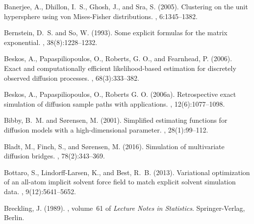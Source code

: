 \documentclass[oneside,11pt]{article}
\begin{document}
\begin{thebibliography}{}
	
	Banerjee, A., Dhillon, I.~S., Ghosh, J., and Sra, S. (2005).
	\newblock Clustering on the unit hypersphere using von {M}ises-{F}isher
	distributions.
	, 6:1345--1382.
	
	Bernstein, D.~S. and So, W. (1993).
	\newblock Some explicit formulas for the matrix exponential.
	, 38(8):1228--1232.
	
	Beskos, A., Papaspiliopoulos, O., Roberts, G. O., and Fearnhead, P. (2006).
	\newblock Exact and
computationally efficient likelihood-based estimation for discretely observed
	diffusion processes. 
	, 68(3):333--382.
	
	Beskos, A., Papaspiliopoulos, O., Roberts G. O. (2006a).
	\newblock Retrospective exact simulation of diffusion sample paths with applications. 
	, 12(6):1077--1098.

	Bibby, B.~M. and S{\o}rensen, M. (2001).
	\newblock Simplified estimating functions for diffusion models with a
	high-dimensional parameter.
	, 28(1):99--112.
	
	Bladt, M., Finch, S., and {S\o rensen}, M. (2016).
	\newblock Simulation of multivariate diffusion
bridges. 
	, 78(2):343--369.
	
	Bottaro, S., Lindorff-Larsen, K., and Best, R.~B. (2013).
	\newblock Variational optimization of an all-atom implicit solvent force field
	to match explicit solvent simulation data.
	, 9(12):5641--5652.
	
	Breckling, J. (1989).
	, volume~61 of {\em Lecture Notes in Statistics}.
	\newblock Springer-Verlag, Berlin.
	

\end{thebibliography}
\end{document}
